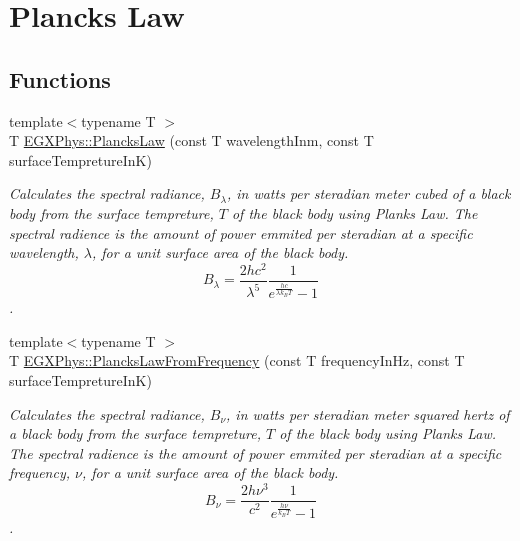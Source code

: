 \hypertarget{group___e_g_x_phys-_electrodynamics-_black_body-_plancks_law}{}\section{Planck\textquotesingle{}s Law}
\label{group___e_g_x_phys-_electrodynamics-_black_body-_plancks_law}
\subsection*{Functions}
\begin{DoxyCompactItemize}
\item 
{\footnotesize template$<$typename T $>$ }\\T \mbox{\hyperlink{group___e_g_x_phys-_electrodynamics-_black_body-_plancks_law_ga44d8dc3e072ffc7d860cd8f07463f091}{E\+G\+X\+Phys\+::\+Plancks\+Law}} (const T wavelength\+Inm, const T surface\+Tempreture\+InK)
\begin{DoxyCompactList}\small\item\em Calculates the spectral radiance, $B_{\lambda}$, in watts per steradian meter cubed of a black body from the surface tempreture, $T$ of the black body using Plank\textquotesingle{}s Law. The spectral radience is the amount of power emmited per steradian at a specific wavelength, $\lambda$, for a unit surface area of the black body. \[ B_{\lambda} = \dfrac{2 h c^2}{\lambda^5} \dfrac{1}{e^{\frac{hc}{\lambda k_B T}} - 1} \]. \end{DoxyCompactList}\item 
{\footnotesize template$<$typename T $>$ }\\T \mbox{\hyperlink{group___e_g_x_phys-_electrodynamics-_black_body-_plancks_law_ga68aae82f8a086831358c4a61c8c80ba4}{E\+G\+X\+Phys\+::\+Plancks\+Law\+From\+Frequency}} (const T frequency\+In\+Hz, const T surface\+Tempreture\+InK)
\begin{DoxyCompactList}\small\item\em Calculates the spectral radiance, $B_{\nu}$, in watts per steradian meter squared hertz of a black body from the surface tempreture, $T$ of the black body using Plank\textquotesingle{}s Law. The spectral radience is the amount of power emmited per steradian at a specific frequency, $\nu$, for a unit surface area of the black body. \[ B_{\nu} = \dfrac{2 h \nu^3}{c^2} \dfrac{1}{e^{\frac{h\nu}{k_B T}} - 1} \]. \end{DoxyCompactList}\item 

\end{DoxyCompactItemize}
